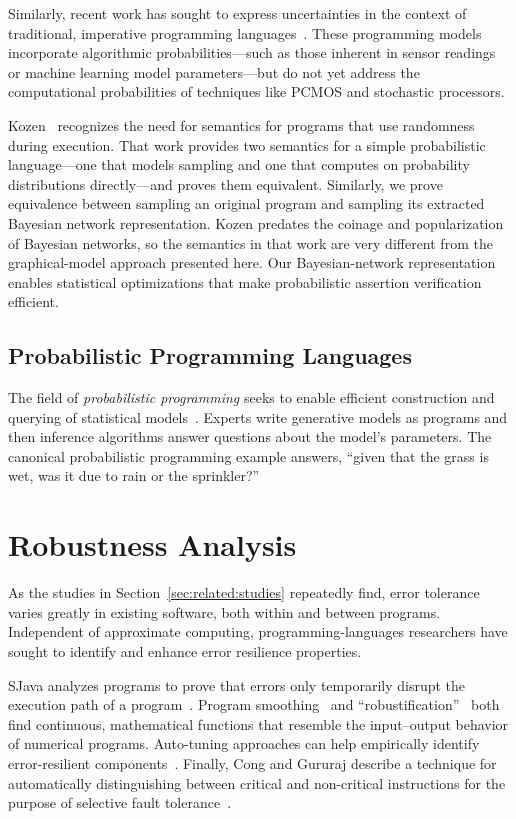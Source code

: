 Similarly, recent work has sought to express
uncertainties in the context of traditional, imperative programming
languages~\cite{uncertaint}. These programming models incorporate algorithmic
probabilities---such as those inherent in sensor readings or machine learning
model parameters---but do not yet address the computational probabilities of
techniques like PCMOS and stochastic processors.

Kozen~\cite{kozen} recognizes the need for semantics for programs
that use randomness during execution.
That work provides two semantics for a simple probabilistic
language---one that models sampling and one that computes on probability
distributions directly---and proves them equivalent.
Similarly, we prove equivalence between sampling an original program and
sampling its extracted Bayesian network representation.
Kozen predates the coinage and popularization of Bayesian networks, so
the semantics in that work are very different from the graphical-model approach
presented here.
Our Bayesian-network representation enables statistical optimizations that
make probabilistic assertion verification efficient.

\subsection{Probabilistic Programming Languages}

The field of \emph{probabilistic programming} seeks to enable efficient
construction and querying of statistical models~\cite{BBGR13, wingate-lightweight,
  church, chaganty, pfeffersample, probdsl, koller}.  Experts write
generative models as programs and then inference algorithms answer questions
about the model's parameters. The canonical probabilistic programming example
answers, ``given that the grass is wet, was it due to rain or the sprinkler?''


\section{Robustness Analysis}

As the studies in Section~\ref{sec:related:studies} repeatedly find, error
tolerance varies greatly in existing software, both within and between
programs.
Independent of approximate computing, programming-languages researchers have
sought to identify and enhance error resilience properties.

SJava analyzes programs to prove that
errors only temporarily disrupt the execution path of a program~\cite{sjava}.
Program smoothing~\cite{smoothing-cav, smoothing-pldi, smoothing-fse} and
``robustification''~\cite{robustification} both find continuous, mathematical
functions that resemble the input--output behavior of numerical programs.
Auto-tuning approaches can help empirically identify error-resilient
components~\cite{asac}.
Finally, Cong and Gururaj describe a technique for automatically
distinguishing between critical and non-critical instructions for the purpose
of selective fault tolerance~\cite{cong-iccad}.

